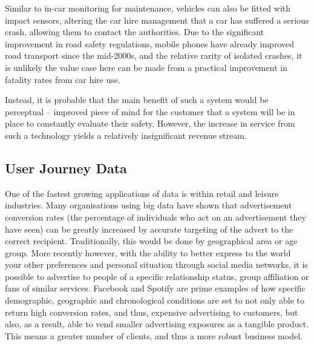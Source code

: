 \documentclass[journal]{IEEEtran}
\begin{document}
Similar to in-car monitoring for maintenance, vehicles can also be
fitted with impact sensors, altering the car hire management that a
car has suffered a serious crash, allowing them to contact the
authorities.  Due to the significant improvement in road safety
regulations, mobile phones have already improved road transport since
the mid-2000s, and the relative rarity of isolated crashes, it is
unlikely the value case here can be made from a practical improvement
in fatality rates from car hire use.

Instead, it is probable that the main benefit of such a system would
be perceptual – improved piece of mind for the customer that a system
will be in place to constantly evaluate their safety.  However, the
increase in service from such a technology yields a relatively
insignificant revenue stream.

\subsection{User Journey Data}

One of the fastest growing applications of data is within retail and
leisure industries.  Many organisations using big data have shown that
advertisement conversion rates (the percentage of individuals who act
on an advertisement they have seen) can be greatly increased by
accurate targeting of the advert to the correct
recipient. Traditionally, this would be done by geographical area or
age group. More recently however, with the ability to better express
to the world your other preferences and personal situation through
social media networks, it is possible to advertise to people of a
specific relationship status, group affiliation or fans of similar
services. Facebook and Spotify are prime examples of how specific
demographic, geographic and chronological conditions are set to not
only able to return high conversion rates, and thus, expensive
advertising to customers, but also, as a result, able to vend smaller
advertising exposures as a tangible product. This means a greater
number of clients, and thus a more robust business model.
\end{document}
